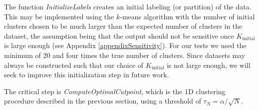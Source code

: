 \documentclass[10pt]{article}
\begin{document}

The function \emph{InitializeLabels} creates an initial labeling (or partition) of the data. This may be implemented using the $k$-means algorithm with the number of initial clusters chosen to be much larger than the expected number of clusters in the dataset, the assumption being that the output should not be sensitive once $K_\text{initial}$ is large enough (see Appendix \ref{appendixSensitivity}). For our tests we used the minimum of $20$ and four times the true number of clusters. Since datasets may always be constructed such that our choice of $K_\text{initial}$ is not large enough, we will seek to improve this initialization step in future work.

The critical step is \emph{ComputeOptimalCutpoint}, which is the 1D clustering procedure described in the previous section, using a threshold of $\tau_N=\alpha/\sqrt{N}$.

\end{document}
